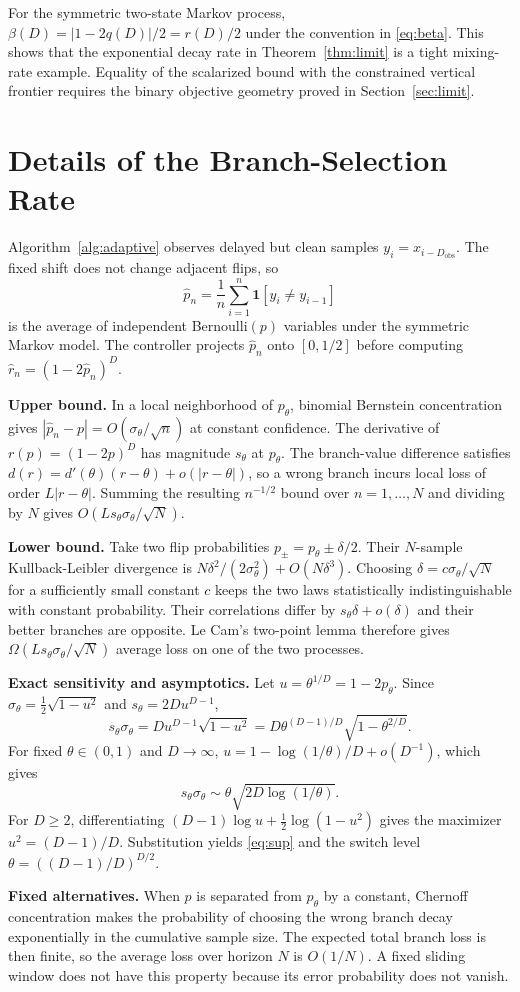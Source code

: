 For the symmetric two-state Markov process,
$\beta(D)=|1-2q(D)|/2=r(D)/2$ under the convention in \eqref{eq:beta}. This shows
that the exponential decay rate in Theorem~\ref{thm:limit} is a tight mixing-rate
example. Equality of the scalarized bound with the constrained vertical frontier
requires the binary objective geometry proved in Section~\ref{sec:limit}.

\section{Details of the Branch-Selection Rate}
\label{app:regret}
Algorithm~\ref{alg:adaptive} observes delayed but clean samples
$y_i=x_{i-D_{\mathrm{obs}}}$. The fixed shift does not change adjacent flips, so
\[
\hat p_n=\frac1n\sum_{i=1}^n\mathbf 1[y_i\neq y_{i-1}]
\]
is the average of independent Bernoulli$(p)$ variables under the symmetric
Markov model. The controller projects $\hat p_n$ onto $[0,1/2]$ before computing
$\hat r_n=(1-2\hat p_n)^D$.

\noindent\textbf{Upper bound.}
In a local neighborhood of $p_\theta$, binomial Bernstein concentration gives
$|\hat p_n-p|=O(\sigma_\theta/\sqrt n)$ at constant confidence. The derivative
of $r(p)=(1-2p)^D$ has magnitude $s_\theta$ at $p_\theta$. The branch-value
difference satisfies
$d(r)=d'(\theta)(r-\theta)+o(|r-\theta|)$, so a wrong branch incurs local loss of
order $L|r-\theta|$. Summing the resulting $n^{-1/2}$ bound over
$n=1,\dots,N$ and dividing by $N$ gives
$O(Ls_\theta\sigma_\theta/\sqrt N)$.

\noindent\textbf{Lower bound.}
Take two flip probabilities
$p_{\pm}=p_\theta\pm\delta/2$. Their $N$-sample Kullback-Leibler divergence is
$N\delta^2/(2\sigma_\theta^2)+O(N\delta^3)$. Choosing
$\delta=c\sigma_\theta/\sqrt N$ for a sufficiently small constant $c$ keeps the
two laws statistically indistinguishable with constant probability. Their
correlations differ by
$s_\theta\delta+o(\delta)$ and their better branches are opposite. Le Cam's
two-point lemma \cite{tsybakov} therefore gives
$\Omega(Ls_\theta\sigma_\theta/\sqrt N)$ average loss on one of the two
processes.

\noindent\textbf{Exact sensitivity and asymptotics.}
Let $u=\theta^{1/D}=1-2p_\theta$. Since
$\sigma_\theta=\tfrac12\sqrt{1-u^2}$ and
$s_\theta=2D u^{D-1}$,
\begin{equation}\label{eq:exactsens}
s_\theta\sigma_\theta
=D u^{D-1}\sqrt{1-u^2}
=D\theta^{(D-1)/D}\sqrt{1-\theta^{2/D}}.
\end{equation}
For fixed $\theta\in(0,1)$ and $D\to\infty$,
$u=1-\log(1/\theta)/D+o(D^{-1})$, which gives
\[
s_\theta\sigma_\theta
\sim \theta\sqrt{2D\log(1/\theta)}.
\]
For $D\ge2$, differentiating
$(D-1)\log u+\tfrac12\log(1-u^2)$ gives the maximizer
$u^2=(D-1)/D$. Substitution yields \eqref{eq:sup} and the switch level
$\theta=((D-1)/D)^{D/2}$.

\noindent\textbf{Fixed alternatives.}
When $p$ is separated from $p_\theta$ by a constant, Chernoff concentration makes
the probability of choosing the wrong branch decay exponentially in the
cumulative sample size. The expected total branch loss is then finite, so the
average loss over horizon $N$ is $O(1/N)$. A fixed sliding window does not have
this property because its error probability does not vanish.
